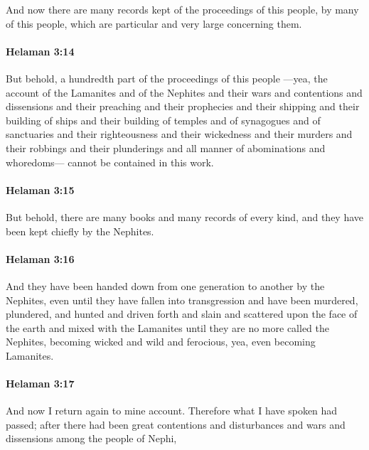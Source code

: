 			And now there are many records kept
			of the proceedings of this people, by many of this people,
			which are particular and very large concerning them.

		\paragraph{Helaman 3:14} %
			\label{HELAMAN-3-14}

			But behold, a hundredth part of the proceedings of this people
			---yea, the account of the Lamanites and of the Nephites
			and their wars and contentions and dissensions
			and their preaching and their prophecies
			and their shipping and their building of ships
			and their building of temples and of synagogues and of sanctuaries
			and their righteousness and their wickedness
			and their murders and their robbings and their plunderings
			and all manner of abominations and whoredoms---
			cannot be contained in this work.

		\paragraph{Helaman 3:15} %
			\label{HELAMAN-3-15}

			But behold, there are many books and many records of every kind,
			and they have been kept chiefly by the Nephites.

		\paragraph{Helaman 3:16} %
			\label{HELAMAN-3-16}

			And they have been handed down from one generation to another by the Nephites,
			even until they have fallen into transgression
			and have been murdered, plundered, and hunted
			and driven forth and slain
			and scattered upon the face of the earth
			and mixed with the Lamanites
			until they are no more called the Nephites,
			becoming wicked and wild and ferocious,
			yea, even becoming Lamanites.

		\paragraph{Helaman 3:17} %
			\label{HELAMAN-3-17}

			And now I return again to mine account.
			Therefore what I have spoken had passed;
			after there had been great contentions and disturbances
			and wars and dissensions among the people of Nephi,

